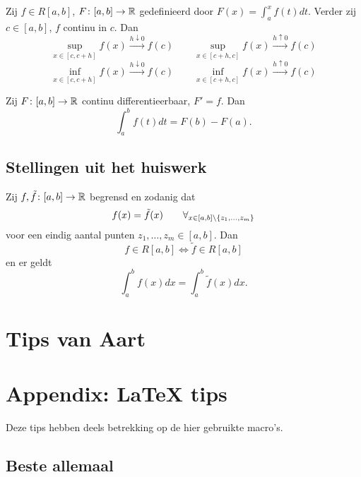 \documentclass{2wa40summary}
\begin{document}
			\begin{lemma}
				Zij $ f \in R[a,b] $, $F\colon [a,b] \to \mathbb{R}$ gedefinieerd door $ F(x) = \int_a^x f(t)dt $. Verder zij $ c \in [a,b] $, $f$ continu in $c$. Dan
				\[ 
					\sup_{x \in [c,c+h]} f(x) \xrightarrow{h \downarrow 0} f(c)
					\qquad
					\sup_{x \in [c+h,c]} f(x) \xrightarrow{h \uparrow 0} f(c)
				 \]
				 \[ 
					\inf_{x \in [c,c+h]} f(x) \xrightarrow{h \downarrow 0} f(c)
					\qquad
					\inf_{x \in [c+h,c]} f(x) \xrightarrow{h \uparrow 0} f(c)
				  \]
			\end{lemma}
			
			\begin{theorem}
				Zij $ F\colon [a,b] \to \mathbb{R} $ continu differentieerbaar, $ F'=f $. Dan
				\[ 
					\int_a^b f(t)dt = F(b)-F(a).
				 \]
			\end{theorem}
			
		\subsection{Stellingen uit het huiswerk}
			\begin{theorem}
				Zij $ f, \tilde f \colon [a,b] \to \mathbb{R} $ begrensd en zodanig dat 
				\[ 
					f(x) = \tilde f(x) \qquad \forall_{x \in [a,b] \backslash\lbrace z_1, \ldots, z_m\rbrace}
				 \]
				 voor een eindig aantal punten $ z_1, \ldots, z_m \in [a,b] $. Dan
				 \[ 
					 f \in R[a,b] \iff \tilde f \in R[a,b]
				  \]
				  en er geldt
				  \[ 
					  \int_a^b f(x)dx = \int_a^b \tilde f(x)dx.
				   \]
			\end{theorem}
		
		\newpage
		\section{Tips van Aart}			
%		
		
		
		
		
		\newpage
		
		\appendix
		\section{Appendix: LaTeX tips}
		
		\opm Deze tips hebben deels betrekking op de hier gebruikte macro's.
		
		\subsection{Beste allemaal}
		
\end{document}
